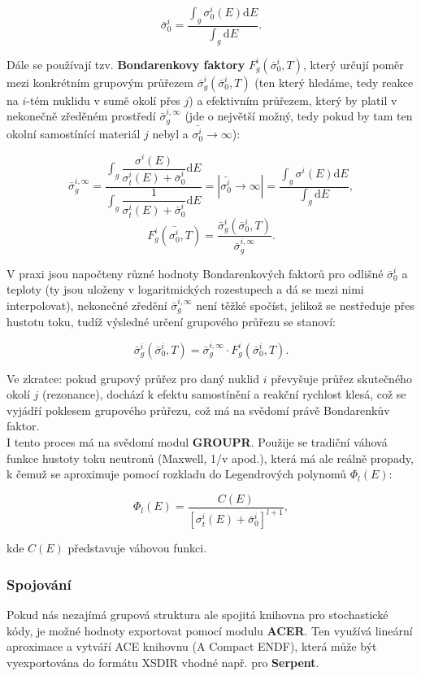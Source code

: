 $$ \bar{\sigma}_0^i = \dfrac{\int_g \sigma^i_0(E) \text{d}E}{\int_g \text{d}E}.$$

Dále se používají tzv. \textbf{Bondarenkovy faktory} $F_g^i(\bar{\sigma}_0^i, T)$, který určují poměr mezi konkrétním grupovým průřezem $\bar{\sigma}_g^i(\bar{\sigma}_0^i, T)$ (ten který hledáme, tedy reakce na $i$-tém nuklidu v sumě okolí přes $j$) a efektivním průřezem, který by platil v nekonečně zředěném prostředí $\bar{\sigma}_g^{i,\infty}$ (jde o největší možný, tedy pokud by tam ten okolní samostínící materiál $j$ nebyl a $\bar{\sigma_0^i} \rightarrow \infty$):

$$ \bar{\sigma}_g^{i,\infty} = \dfrac{\int_g \dfrac{\sigma^i(E)}{\sigma_t^i(E) + \bar{\sigma}_0^i} \text{d}E}{\int_g \dfrac{1}{\sigma_t^i(E) + \bar{\sigma}_0^i} \text{d}E} = |\bar{\sigma_0^i} \rightarrow \infty| = \dfrac{\int_g \sigma^i(E) \text{d}E}{\int_g \text{d}E},$$
$$ F_g^i (\bar{\sigma_0^i}, T) = \dfrac{\bar{\sigma}_g^i(\bar{\sigma}_0^i, T)}{\bar{\sigma}_g^{i,\infty}}. $$

V praxi jsou napočteny různé hodnoty Bondarenkových faktorů pro odlišné $\bar{\sigma}_0^i$ a teploty (ty jsou uloženy v logaritmických rozestupech a dá se mezi nimi interpolovat), nekonečné zředění $\bar{\sigma}_g^{i,\infty}$ není těžké spočíst, jelikož se nestředuje přes hustotu toku, tudíž výsledné určení grupového průřezu se stanoví:

\begin{equation}
  \boxed{
    \bar{\sigma}_g^i(\bar{\sigma}_0^i, T) = \bar{\sigma}_g^{i,\infty} \cdot F_g^i (\bar{\sigma}_0^i, T).}
\end{equation}

Ve zkratce: pokud grupový průřez pro daný nuklid  $i$ převyšuje průřez skutečného okolí $j$ (rezonance), dochází k efektu samostínění a reakční rychlost klesá, což se vyjádří poklesem grupového průřezu, což má na svědomí právě Bondarenkův faktor.\\

I tento proces má na svědomí modul \textbf{GROUPR}. Použije se tradiční váhová funkce hustoty toku neutronů (Maxwell, 1/v apod.), která má ale reálně propady, k čemuž se aproximuje pomocí rozkladu do Legendrových polynomů $\Phi_l(E)$:

$$\Phi_l(E) = \dfrac{C(E)}{\left [ \sigma_t^i(E) + \bar{\sigma}_0^i \right ]^{l+1}},$$

\noindent kde $C(E)$ představuje váhovou funkci.

\subsubsection{Spojování}

Pokud nás nezajímá grupová struktura ale spojitá knihovna pro stochastické kódy, je možné hodnoty exportovat pomocí modulu \textbf{ACER}. Ten využívá lineární aproximace a vytváří ACE knihovnu (A Compact ENDF), která může být vyexportována do formátu XSDIR vhodné např. pro \textbf{Serpent}.